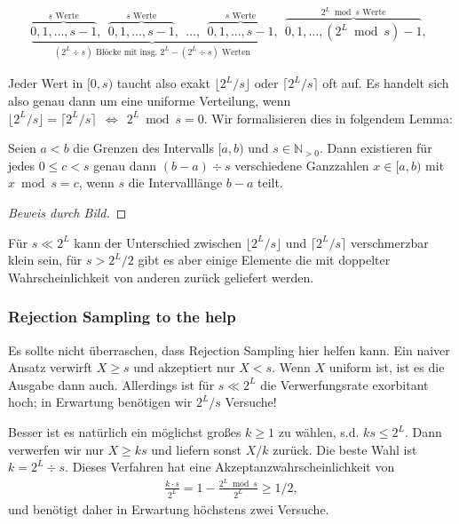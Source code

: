 \begin{align}
    \underbrace{
        \overbrace{0, 1, \ldots, s{-}1}^\text{$s$ Werte},\ \
        \overbrace{0, 1, \ldots, s{-}1}^\text{$s$ Werte},\ \
        \ldots, \ \
        \overbrace{0, 1, \ldots, s{-}1}^\text{$s$ Werte}
    }_\text{$(2^L \div s)$ Blöcke mit insg. $2^L - (2^L \div s)$ Werten},\ \
    \overbrace{0, 1, \ldots, (2^L \bmod s){-}1}^\text{$2^L \bmod s$ Werte},\ \
    \label{eq:s_bloecke_in_2l}
\end{align}

Jeder Wert in $[0, s)$ taucht also exakt $\lfloor 2^L / s \rfloor$ oder $\lceil 2^L /s \rceil$ oft auf.
Es handelt sich also genau dann um eine uniforme Verteilung, wenn $\lfloor 2^L / s \rfloor = \lceil 2^L /s \rceil\ \ \Leftrightarrow\ \ 2^L \bmod s = 0$.
Wir formalisieren dies in folgendem Lemma:

\begin{lemma}\label{lem:gleichverteilt_in_ab}
    Seien $a < b$ die Grenzen des Intervalls $[a, b)$ und $s \in \mathbb N_{>0}$.
    Dann existieren für jedes $0 \le c < s$ genau dann $(b - a) \div s$ verschiedene Ganzzahlen $x \in [a, b)$ mit $x \bmod s = c$, wenn $s$ die Intervalllänge $b-a$ teilt.
\end{lemma}
\begin{proof}[Beweis durch Bild]
\end{proof}

Für $s \ll 2^L$ kann der Unterschied zwischen $\lfloor 2^L /s \rfloor$ und $\lceil 2^L / s \rceil$ verschmerzbar klein sein, für $s > 2^L / 2$ gibt es aber einige Elemente die mit doppelter Wahrscheinlichkeit von anderen zurück geliefert werden.

\subsubsection{Rejection Sampling to the help}
Es sollte nicht überraschen, dass Rejection Sampling hier helfen kann.
Ein naiver Ansatz verwirft $X \ge s$ und akzeptiert nur $X < s$.
Wenn $X$ uniform ist, ist es die Ausgabe dann auch.
Allerdings ist für $s \ll 2^L$ die Verwerfungsrate exorbitant hoch;
in Erwartung benötigen wir $2^L / s$ Versuche!

Besser ist es natürlich ein möglichst großes $k \ge 1$ zu wählen, s.d. $k s \le 2^L$.
Dann verwerfen wir nur $X \ge ks$ und liefern sonst $X / k$ zurück.
Die beste Wahl ist $k = 2^L \div s$.
Dieses Verfahren hat eine Akzeptanzwahrscheinlichkeit von
\begin{align}
    \frac{k \cdot s}{2^L} = 1 - \frac{2^L \bmod s}{2^L} \ge 1/2,
\end{align}
und benötigt daher in Erwartung höchstens zwei Versuche.

